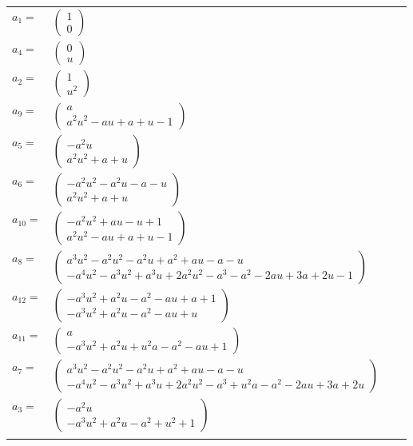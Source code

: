 \documentclass[1p]{elsarticle_modified}
\theoremstyle{definition}
\begin{document}
\begin{tabular}{m{7pt} m{180pt} m{7pt} m{180pt} }
\flushright $a_{1}=$&$\begin{pmatrix}1\\0\end{pmatrix}$ \\
\flushright $a_{4}=$&$\begin{pmatrix}0\\u\end{pmatrix}$ \\
\flushright $a_{2}=$&$\begin{pmatrix}1\\u^2\end{pmatrix}$ \\
\flushright $a_{9}=$&$\begin{pmatrix}a\\a^2 u^2- a u+a+u-1\end{pmatrix}$ \\
\flushright $a_{5}=$&$\begin{pmatrix}- a^2 u\\a^2 u^2+a+u\end{pmatrix}$ \\
\flushright $a_{6}=$&$\begin{pmatrix}- a^2 u^2- a^2 u- a- u\\a^2 u^2+a+u\end{pmatrix}$ \\
\flushright $a_{10}=$&$\begin{pmatrix}- a^2 u^2+a u- u+1\\a^2 u^2- a u+a+u-1\end{pmatrix}$ \\
\flushright $a_{8}=$&$\begin{pmatrix}a^3 u^2- a^2 u^2- a^2 u+a^2+a u- a- u\\- a^4 u^2- a^3 u^2+a^3 u+2 a^2 u^2- a^3- a^2-2 a u+3 a+2 u-1\end{pmatrix}$ \\
\flushright $a_{12}=$&$\begin{pmatrix}- a^3 u^2+a^2 u- a^2- a u+a+1\\- a^3 u^2+a^2 u- a^2- a u+u\end{pmatrix}$ \\
\flushright $a_{11}=$&$\begin{pmatrix}a\\- a^3 u^2+a^2 u+u^2 a- a^2- a u+1\end{pmatrix}$ \\
\flushright $a_{7}=$&$\begin{pmatrix}a^3 u^2- a^2 u^2- a^2 u+a^2+a u- a- u\\- a^4 u^2- a^3 u^2+a^3 u+2 a^2 u^2- a^3+u^2 a- a^2-2 a u+3 a+2 u\end{pmatrix}$ \\
\flushright $a_{3}=$&$\begin{pmatrix}- a^2 u\\- a^3 u^2+a^2 u- a^2+u^2+1\end{pmatrix}$\\&\end{tabular}
\end{document}
